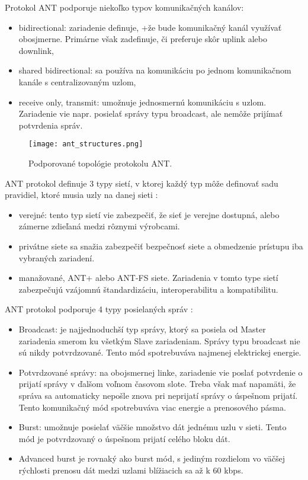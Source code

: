 \documentclass[12pt,a4wide,oneside,openright]{report}
\begin{document}
Protokol ANT podporuje niekoľko typov komunikačných kanálov:
\begin{itemize}
	\item bidirectional: zariadenie definuje, +že bude komunikačný kanál využívať obosjmerne. Primárne však zadefinuje, či preferuje skôr uplink alebo downlink,
	\item shared bidirectional: sa používa na komunikáciu po jednom komunikačnom kanále s centralizovaným uzlom,
	\item receive only, transmit: umožnuje jednosmernú komunikáciu s uzlom. Zariadenie vie napr. posielať správy typu broadcast, ale nemôže prijímať potvrdenia správ.
\end{itemize}

\begin{figure*}[h]
	\centering
	\texttt{[image: ant\_structures.png]}
	\caption{Podporované topológie protokolu ANT.\cite{ANT}}
	\label{f:a_ant_network_types}
\end{figure*}

ANT protokol definuje 3 typy sietí, v ktorej každý typ môže definovať sadu pravidiel, ktoré musia uzly na danej sieti \cite{ANT}:
\begin{itemize}
	\item verejné: tento typ sietí vie zabezpečiť, že sieť je verejne dostupná, alebo zámerne zdieľaná medzi rôznymi výrobcami.
	\item privátne siete sa snažia zabezpečiť bezpečnosť siete a obmedzenie prístupu iba vybraných zariadení.%
	\item manažované, ANT+ alebo ANT-FS siete. Zariadenia v tomto type sietí zabezpečujú vzájomnú štandardizáciu, interoperabilitu a kompatibilitu.
\end{itemize}
\onehalfspacing

ANT protokol podporuje 4 typy posielaných správ \cite{ANT}:
\begin{itemize}
	\item Broadcast: je najjednoduchší typ správy, ktorý sa posiela od Master zariadenia smerom ku všetkým Slave zariadeniam. Správy typu broadcast nie sú nikdy potvrdzované. Tento mód spotrebuváva najmenej elektrickej energie.
	\item Potvrdzované správy: na obojsmernej linke, zariadenie vie poslať potvrdenie o prijatí správy v ďalšom voľnom časovom slote. Treba však mať napamäti, že správa sa automaticky nepošle znova pri neprijatí správy o úspešnom prijatí. Tento komunikačný mód spotrebuváva viac energie a prenosového pásma.
	\item Burst: umožnuje posielať väčšie množstvo dát jednému uzlu v sieti. Tento mód je potvrdzovaný o úspešnom prijatí celého bloku dát.
	\item Advanced burst je rovnaký ako burst mód, s jediným rozdielom vo väčšej rýchlosti prenosu dát medzi uzlami blížiacich sa až k 60 kbps.
\end{itemize}
\onehalfspacing
\end{document}
